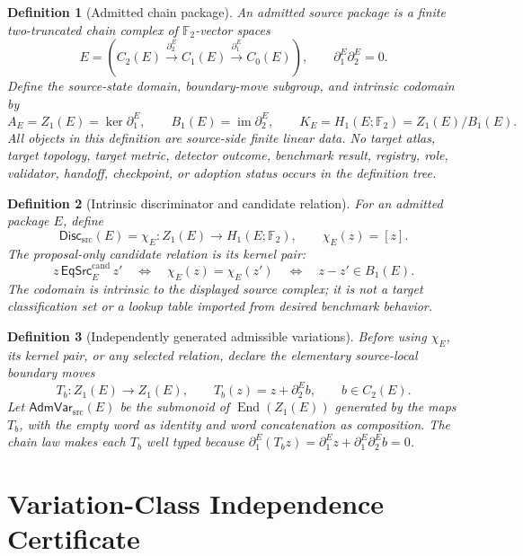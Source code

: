\documentclass[11pt]{article}
\newtheorem{definition}{Definition}
\newcommand{\Ftwo}{\mathbb F_2}
\newcommand{\Disc}{\mathsf{Disc}_{\mathrm{src}}}
\newcommand{\AdmVar}{\mathsf{AdmVar}_{\mathrm{src}}}
\newcommand{\EqCand}{\mathsf{EqSrc}^{\mathrm{cand}}}
\begin{document}
\begin{definition}[Admitted chain package]
An admitted source package is a finite two-truncated chain complex of
\(\Ftwo\)-vector spaces
\[
 E=\left(C_2(E)\xrightarrow{\partial_2^E}
 C_1(E)\xrightarrow{\partial_1^E}C_0(E)\right),
 \qquad \partial_1^E\partial_2^E=0.
\]
Define the source-state domain, boundary-move subgroup, and intrinsic
codomain by
\[
 A_E=Z_1(E)=\ker\partial_1^E,\qquad
 B_1(E)=\operatorname{im}\partial_2^E,\qquad
 K_E=H_1(E;\Ftwo)=Z_1(E)/B_1(E).
\]
All objects in this definition are source-side finite linear data. No target
atlas, target topology, target metric, detector outcome, benchmark result,
registry, role, validator, handoff, checkpoint, or adoption status occurs in
the definition tree.
\end{definition}

\begin{definition}[Intrinsic discriminator and candidate relation]
For an admitted package \(E\), define
\[
 \Disc(E)=\chi_E:Z_1(E)\longrightarrow H_1(E;\Ftwo),
 \qquad \chi_E(z)=[z].
\]
The proposal-only candidate relation is its kernel pair:
\[
 z\,\EqCand_E\,z'
 \quad\Longleftrightarrow\quad
 \chi_E(z)=\chi_E(z')
 \quad\Longleftrightarrow\quad
 z-z'\in B_1(E).
\]
The codomain is intrinsic to the displayed source complex; it is not a target
classification set or a lookup table imported from desired benchmark
behavior.
\end{definition}

\begin{definition}[Independently generated admissible variations]
Before using \(\chi_E\), its kernel pair, or any selected relation, declare
the elementary source-local boundary moves
\[
 T_b:Z_1(E)\longrightarrow Z_1(E),\qquad
 T_b(z)=z+\partial_2^E b,\qquad b\in C_2(E).
\]
Let \(\AdmVar(E)\) be the submonoid of
\(\operatorname{End}(Z_1(E))\) generated by the maps \(T_b\), with the empty
word as identity and word concatenation as composition. The chain law makes
each \(T_b\) well typed because
\(\partial_1^E(T_bz)=\partial_1^Ez+
\partial_1^E\partial_2^Eb=0\).
\end{definition}

\section{Variation-Class Independence Certificate}
\end{document}

